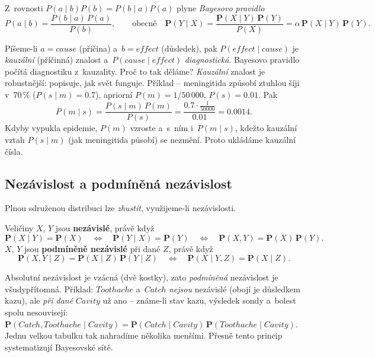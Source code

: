\begin{definice}
Z~rovnosti $P(a\mid b)P(b)=P(b\mid a)P(a)$ plyne \emph{Bayesovo pravidlo}
\[ P(a\mid b)=\frac{P(b\mid a)\,P(a)}{P(b)}, \qquad\text{obecně}\quad \mathbf{P}(Y\mid X)=\frac{\mathbf{P}(X\mid Y)\,\mathbf{P}(Y)}{P(X)}=\alpha\,\mathbf{P}(X\mid Y)\,\mathbf{P}(Y). \]
\end{definice}

\begin{intuice}
Píšeme-li $a=cause$ (příčina) a~$b=effect$ (důsledek), pak $P(effect\mid cause)$ je \emph{kauzální} (příčinná) znalost a~$P(cause\mid effect)$ \emph{diagnostická}. Bayesovo pravidlo počítá diagnostiku z~kauzality. Proč to tak děláme? \emph{Kauzální} znalost je robustnější: popisuje, jak svět funguje. Příklad -- meningitida způsobí ztuhlou šíji v~$70\,\%$ ($P(s\mid m)=0.7$), apriorní $P(m)=1/50\,000$, $P(s)=0.01$. Pak
\[ P(m\mid s)=\frac{P(s\mid m)\,P(m)}{P(s)}=\frac{0.7\cdot\tfrac{1}{50000}}{0.01}=0.0014. \]
Kdyby vypukla epidemie, $P(m)$ vzroste a~s~ním i~$P(m\mid s)$, kdežto kauzální vztah $P(s\mid m)$ (jak meningitida působí) se nezmění. Proto ukládáme kauzální čísla.
\end{intuice}

\subsection{Nezávislost a podmíněná nezávislost}

Plnou sdruženou distribuci lze \emph{zhustit}, využijeme-li nezávislosti.

\begin{definice}
Veličiny $X$, $Y$ jsou \textbf{nezávislé}, právě když
\[ \mathbf{P}(X\mid Y)=\mathbf{P}(X)\quad\Longleftrightarrow\quad \mathbf{P}(Y\mid X)=\mathbf{P}(Y)\quad\Longleftrightarrow\quad \mathbf{P}(X,Y)=\mathbf{P}(X)\,\mathbf{P}(Y). \]
$X$, $Y$ jsou \textbf{podmíněně nezávislé} při dané $Z$, právě když
\[ \mathbf{P}(X,Y\mid Z)=\mathbf{P}(X\mid Z)\,\mathbf{P}(Y\mid Z)\quad\Longleftrightarrow\quad \mathbf{P}(X\mid Y,Z)=\mathbf{P}(X\mid Z). \]
\end{definice}

\begin{intuice}
Absolutní nezávislost je vzácná (dvě kostky), zato \emph{podmíněná} nezávislost je všudypřítomná. Příklad: $Toothache$ a~$Catch$ \emph{nejsou} nezávislé (obojí je důsledkem kazu), ale \emph{při dané} $Cavity$ už ano -- známe-li stav kazu, výsledek sondy a~bolest spolu nesouvisejí: $\mathbf{P}(Catch,Toothache\mid Cavity)=\mathbf{P}(Catch\mid Cavity)\,\mathbf{P}(Toothache\mid Cavity)$. Jednu velkou tabulku tak nahradíme několika menšími. Přesně tento princip systematizují Bayesovské sítě.
\end{intuice}

